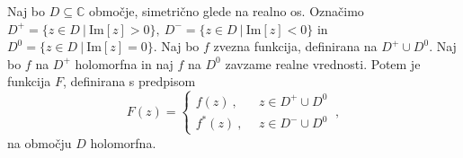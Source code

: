 \documentclass[mat1, tisk]{fmfdelo}
\begin{document}
    \begin{trditev}
        Naj bo $D \subseteq \mathbb{C}$ območje, simetrično glede na realno os. 
        Označimo $D^{+} = \{z \in D~|~\text{Im}[z] > 0\},~D^{-} = \{z \in D~|~\text{Im}[z] < 0\}$ in $D^{0} = \{z \in D~|~\text{Im}[z] = 0\}$.
        Naj bo $f$ zvezna funkcija, definirana na $D^{+} \cup D^0$. Naj bo $f$ na $D^{+}$ holomorfna in naj $f$ na $D^0$ zavzame realne vrednosti.
        Potem je funkcija $F$, definirana s predpisom
        $$
        F(z) = 
        \begin{cases}
            f(z)~,~~&z \in D^{+} \cup D^0\\
            f^*(z)~,~~&z \in D^{-} \cup D^0
        \end{cases}~,
        $$
        na območju $D$ holomorfna.
    \end{trditev}
\end{document}
